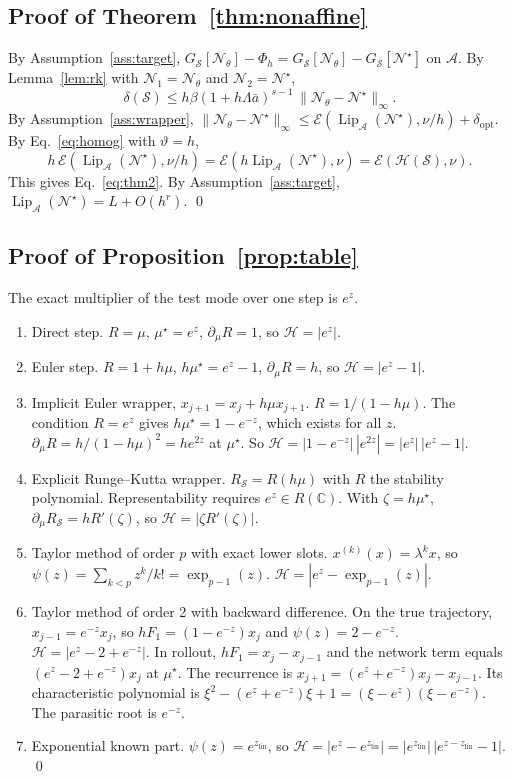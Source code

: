 \documentclass[11pt]{article}
\theoremstyle{definition}
\theoremstyle{remark}
\newcommand{\C}{\mathbb{C}}
\newcommand{\Aset}{\mathcal{A}}          %
\newcommand{\Net}{\mathcal{N}_\theta}    %
\newcommand{\Netstar}{\mathcal{N}^\star} %
\newcommand{\Meth}{\mathcal{S}}          %
\newcommand{\Hard}{\mathcal{H}}          %
\newcommand{\Err}{\mathcal{E}}           %
\newcommand{\Lip}{\operatorname{Lip}_{\Aset}}
\newcommand{\expt}[1]{\exp_{#1}}         %
\begin{document}
\subsection{Proof of Theorem~\ref{thm:nonaffine}}\label{app:nonaffine}
By Assumption~\ref{ass:target}, $G_\Meth[\Net] - \Phi_h = G_\Meth[\Net] - G_\Meth[\Netstar]$ on $\Aset$.
By Lemma~\ref{lem:rk} with $\mathcal N_1 = \Net$ and $\mathcal N_2 = \Netstar$,
\begin{equation*}
\delta(\Meth) \le h\beta(1 + h\Lambda\bar a)^{s-1}\,\|\Net - \Netstar\|_\infty.
\end{equation*}
By Assumption~\ref{ass:wrapper}, $\|\Net - \Netstar\|_\infty \le \Err(\Lip(\Netstar), \nu/h) + \delta_{\mathrm{opt}}$.
By Eq.~\eqref{eq:homog} with $\vartheta = h$,
\begin{equation*}
h\,\Err(\Lip(\Netstar), \nu/h) = \Err(h\Lip(\Netstar), \nu) = \Err(\Hard(\Meth), \nu).
\end{equation*}
This gives Eq.~\eqref{eq:thm2}.
By Assumption~\ref{ass:target}, $\Lip(\Netstar) = L + O(h^r)$. \qed

\subsection{Proof of Proposition~\ref{prop:table}}\label{app:table}
The exact multiplier of the test mode over one step is $e^z$.
\begin{enumerate}[label=(\roman*)]
\item Direct step. $R = \mu$, $\mu^\star = e^z$, $\partial_\mu R = 1$, so $\Hard = |e^z|$.
\item Euler step. $R = 1 + h\mu$, $h\mu^\star = e^z - 1$, $\partial_\mu R = h$, so $\Hard = |e^z - 1|$.
\item Implicit Euler wrapper, $x_{j+1} = x_j + h\mu x_{j+1}$. $R = 1/(1 - h\mu)$. The condition $R = e^z$ gives $h\mu^\star = 1 - e^{-z}$, which exists for all $z$. $\partial_\mu R = h/(1 - h\mu)^2 = h e^{2z}$ at $\mu^\star$. So $\Hard = |1 - e^{-z}|\,|e^{2z}| = |e^z|\,|e^z - 1|$.
\item Explicit Runge--Kutta wrapper. $R_\Meth = R(h\mu)$ with $R$ the stability polynomial. Representability requires $e^z \in R(\C)$. With $\zeta = h\mu^\star$, $\partial_\mu R_\Meth = hR'(\zeta)$, so $\Hard = |\zeta R'(\zeta)|$.
\item Taylor method of order $p$ with exact lower slots. $x^{(k)}(x) = \lambda^k x$, so $\psi(z) = \sum_{k<p} z^k/k! = \expt{p-1}(z)$. $\Hard = |e^z - \expt{p-1}(z)|$.
\item Taylor method of order 2 with backward difference. On the true trajectory, $x_{j-1} = e^{-z}x_j$, so $hF_1 = (1 - e^{-z})x_j$ and $\psi(z) = 2 - e^{-z}$. $\Hard = |e^z - 2 + e^{-z}|$. In rollout, $hF_1 = x_j - x_{j-1}$ and the network term equals $(e^z - 2 + e^{-z})x_j$ at $\mu^\star$. The recurrence is $x_{j+1} = (e^z + e^{-z})x_j - x_{j-1}$. Its characteristic polynomial is $\xi^2 - (e^z + e^{-z})\xi + 1 = (\xi - e^z)(\xi - e^{-z})$. The parasitic root is $e^{-z}$.
\item Exponential known part. $\psi(z) = e^{z_{\mathrm{lin}}}$, so $\Hard = |e^z - e^{z_{\mathrm{lin}}}| = |e^{z_{\mathrm{lin}}}|\,|e^{z - z_{\mathrm{lin}}} - 1|$. \qed
\end{enumerate}
\end{document}
